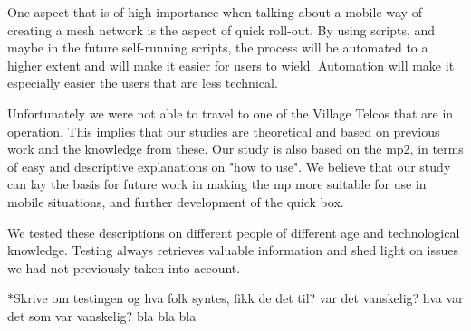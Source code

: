 One aspect that is of high importance when talking about a mobile way of creating a mesh network is the aspect of quick roll-out. By using scripts, and maybe in the future self-running scripts, the process will be automated to a higher extent and will make it easier for users to wield. Automation will make it especially easier the users that are less technical. 

Unfortunately we were not able to travel to one of the Village Telcos that are in operation. This implies that our studies are theoretical and based on previous work and the knowledge from these. Our study is also based on the \gls{mp2}, in terms of easy and descriptive explanations on "how to use". We believe that our study can lay the basis for future work in making the \gls{mp} more suitable for use in mobile situations, and further development of the \gls{quick} box. 

We tested these descriptions on different people of different age and technological knowledge. Testing always retrieves valuable information and shed light on issues we had not previously taken into account. 

*Skrive om testingen og hva folk syntes, fikk de det til? var det vanskelig? hva var det som var vanskelig? bla bla bla





 



